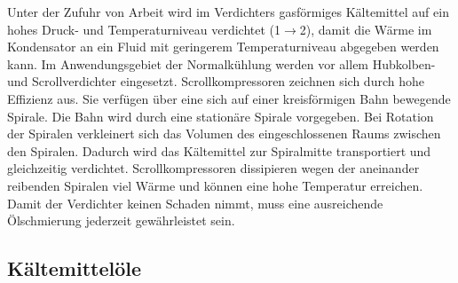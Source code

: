 Unter der Zufuhr von Arbeit wird im Verdichters gasförmiges Kältemittel auf ein hohes Druck- und Temperaturniveau verdichtet (1$\longrightarrow$2), damit die Wärme im Kondensator an ein Fluid mit geringerem Temperaturniveau abgegeben werden kann. Im Anwendungsgebiet der Normalkühlung werden vor allem Hubkolben- und Scrollverdichter eingesetzt. Scrollkompressoren zeichnen sich durch hohe Effizienz aus. Sie verfügen über eine sich auf einer kreisförmigen Bahn bewegende Spirale. Die Bahn wird durch eine stationäre Spirale vorgegeben. Bei Rotation der Spiralen verkleinert sich das Volumen des eingeschlossenen Raums zwischen den Spiralen. Dadurch wird das Kältemittel zur Spiralmitte transportiert und gleichzeitig verdichtet. Scrollkompressoren dissipieren wegen der aneinander reibenden Spiralen viel Wärme und können eine hohe Temperatur erreichen. Damit der Verdichter keinen Schaden nimmt, muss eine ausreichende Ölschmierung jederzeit gewährleistet sein. 



\subsection{Kältemittelöle}
\label{subsec:Kältemittelöle}


